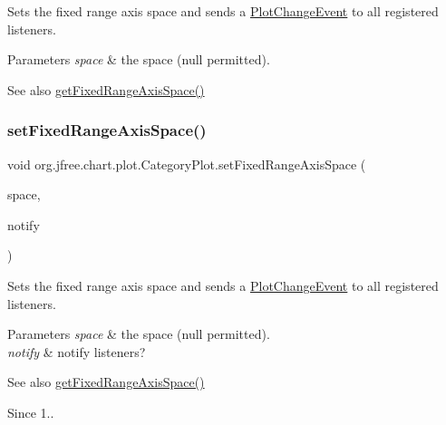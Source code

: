 Sets the fixed range axis space and sends a \mbox{\hyperlink{}{Plot\+Change\+Event}} to all registered listeners.


\begin{DoxyParams}{Parameters}
{\em space} & the space ({\ttfamily null} permitted).\\
\hline
\end{DoxyParams}
\begin{DoxySeeAlso}{See also}
\mbox{\hyperlink{classorg_1_1jfree_1_1chart_1_1plot_1_1_category_plot_a436aced34ca58adf5d445e6a62f861c9}{get\+Fixed\+Range\+Axis\+Space()}} 
\end{DoxySeeAlso}
\mbox{\label{classorg_1_1jfree_1_1chart_1_1plot_1_1_category_plot_a2e0fb5c2ddc9f075eb43d0efff471044}} 
\subsubsection{\texorpdfstring{set\+Fixed\+Range\+Axis\+Space()}{setFixedRangeAxisSpace()}\hspace{0.1cm}{\footnotesize\ttfamily [2/2]}}
{\footnotesize\ttfamily void org.\+jfree.\+chart.\+plot.\+Category\+Plot.\+set\+Fixed\+Range\+Axis\+Space (\begin{DoxyParamCaption}\item[{\mbox{\hyperlink{classorg_1_1jfree_1_1chart_1_1axis_1_1_axis_space}{Axis\+Space}}}]{space,  }\item[{boolean}]{notify }\end{DoxyParamCaption})}

Sets the fixed range axis space and sends a \mbox{\hyperlink{}{Plot\+Change\+Event}} to all registered listeners.


\begin{DoxyParams}{Parameters}
{\em space} & the space ({\ttfamily null} permitted). \\
\hline
{\em notify} & notify listeners?\\
\hline
\end{DoxyParams}
\begin{DoxySeeAlso}{See also}
\mbox{\hyperlink{classorg_1_1jfree_1_1chart_1_1plot_1_1_category_plot_a436aced34ca58adf5d445e6a62f861c9}{get\+Fixed\+Range\+Axis\+Space()}}
\end{DoxySeeAlso}
\begin{DoxySince}{Since}
1.. 
\end{DoxySince}
\mbox{\label{classorg_1_1jfree_1_1chart_1_1plot_1_1_category_plot_a82408e08765664dc74ebd2852d91dfaf}} 
